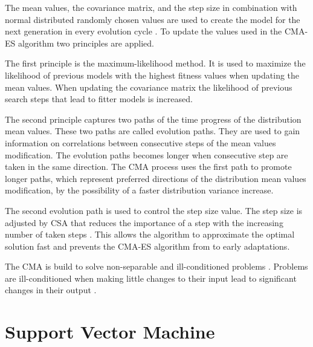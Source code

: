 The mean values, the covariance matrix, and the step size in combination with normal distributed randomly chosen values are used to create the model for the next generation in every evolution cycle \cite{2017CMA-ES}.
To update the values used in the \ac{CMA-ES} algorithm two principles are applied.

The first principle is the maximum-likelihood method.
It is used to maximize the likelihood of previous models with the highest fitness values when updating the mean values.
When updating the covariance matrix the likelihood of previous search steps that lead to fitter models is increased.

The second principle captures two paths of the time progress of the distribution mean values.
These two paths are called evolution paths.
They are used to gain information on correlations between consecutive steps of the mean values modification.
The evolution paths becomes longer when consecutive step are taken in the same direction. %
The \ac{CMA} process uses the first path to promote longer paths, which represent preferred directions of the distribution mean values modification, by the possibility of a faster distribution variance increase. %

The second evolution path is used to control the step size value.
The step size is adjusted by \ac{CSA} that reduces the importance of a step with the increasing number of taken steps \cite{Chotard2012CumulativeFunctions}.
This allows the algorithm to approximate the optimal solution fast and prevents the \ac{CMA-ES} algorithm from to early adaptations. 

The \ac{CMA} is build to solve non-separable and ill-conditioned problems \cite{Hansen2011TheTutorial}.
Problems are ill-conditioned when making little changes to their input lead to significant changes in their output \cite{2016ConditionNumber}.


\section{Support Vector Machine}
\label{sec:svm}

